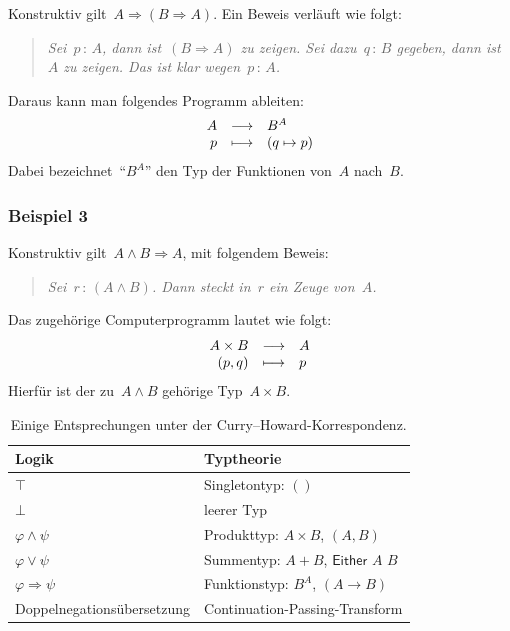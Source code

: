 \documentclass[a4paper,ngerman,12pt]{scrartcl}
\theoremstyle{definition}
\theoremstyle{plain}
\theoremstyle{remark}
\renewcommand{\_}{\mathpunct{.}\,}
\newcommand{\?}{\,{:}\,}
\begin{document}
Konstruktiv gilt~$A \Rightarrow (B \Rightarrow A)$. Ein Beweis verläuft
wie folgt:
\begin{quote}\emph{Sei~$p\?A$, dann ist~$(B \Rightarrow A)$ zu zeigen. Sei
dazu~$q\?B$ gegeben, dann ist~$A$ zu zeigen. Das ist klar
wegen~$p\?A$.}\end{quote}
Daraus kann man folgendes Programm ableiten:
\[ \begin{array}{@{}rcl@{}}
  A &\longrightarrow& B^A \\
  p &\longmapsto& (q \mapsto p)
\end{array} \]
Dabei bezeichnet~"`$B^A$"' den Typ der Funktionen von~$A$ nach~$B$.


\subsubsection*{Beispiel 3}

Konstruktiv gilt~$A \wedge B \Rightarrow A$, mit folgendem Beweis:
\begin{quote}\emph{Sei~$r\?(A \wedge B)$. Dann steckt in~$r$ ein Zeuge
von~$A$.}\end{quote}
Das zugehörige Computerprogramm lautet wie folgt:
\[ \begin{array}{@{}rcl@{}}
  A \times B &\longrightarrow& A \\
  (p,q) &\longmapsto& p
\end{array} \]
Hierfür ist der zu~$A \wedge B$ gehörige Typ~$A \times B$.

\begin{table}
  \centering
  \small
  \begin{tabular}{@{}ll@{}}
    \toprule
    Logik & Typtheorie \\\midrule
    $\top$ & Singletontyp: $()$ \\
    $\bot$ & leerer Typ \\
    $\varphi \wedge \psi$ & Produkttyp: $A \times B$, $(A,B)$ \\
    $\varphi \vee \psi$ & Summentyp: $A + B$, $\mathsf{Either}$ $A$ $B$ \\
    $\varphi \Rightarrow \psi$ & Funktionstyp: $B^A$, $(A \to B)$ \\
    Doppelnegationsübersetzung & Continuation-Passing-Transform
    \\
    \bottomrule
  \end{tabular}
  \caption{\label{tafel:curry-howard}Einige Entsprechungen unter der
  Curry--Howard-Korrespondenz.}
\end{table}
\end{document}
